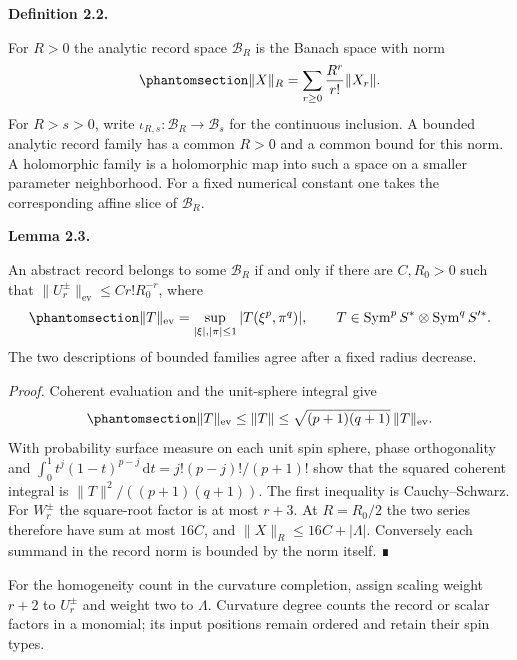 \documentclass[
  english,
  11pt,
  reqno]{amsart}
\makeatletter
\newcommand{\pandocstatementheading}[1]{%
  \par\addpenalty{\@beginparpenalty}%
  \addvspace{.5\baselineskip plus .2\baselineskip minus .2\baselineskip}%
  {\normalfont\bfseries #1\par}%
  \nobreak\@afterindenttrue\@afterheading
}
\makeatother
\begin{document}
\pandocstatementheading{\protect{}\label{def:es-record-scale}Definition 2.2.}

For \(R>0\) the analytic record space \(\mathcal B_R\) is the Banach
space with norm
\begin{equation}\protect\phantomsection\label{eq:es-record-norm}{
 \|X\|_R=\sum_{r\ge0}\frac{R^r}{r!}\|X_r\|.
}\end{equation} For \(R>s>0\), write
\(\iota_{R,s}:\mathcal B_R\to\mathcal B_s\) for the continuous
inclusion. A bounded analytic record family has a common \(R>0\) and a
common bound for this norm. A holomorphic family is a holomorphic map
into such a space on a smaller parameter neighborhood. For a fixed
numerical constant one takes the corresponding affine slice of
\(\mathcal B_R\).

\pandocstatementheading{\protect{}\label{lem:es-record-growth}Lemma 2.3.}

An abstract record belongs to some \(\mathcal B_R\) if and only if there
are \(C,R_0>0\) such that \(\|U_r^\pm\|_{\mathrm{ev}}\le Cr!R_0^{-r}\),
where
\begin{equation}\protect\phantomsection\label{eq:es-evaluation-norm}{
 \|T\|_{\mathrm{ev}}=
 \sup_{|\xi|,|\pi|\le1}|T(\xi^p,\pi^q)|,
 \qquad T\in\operatorname{Sym}^pS^*\otimes\operatorname{Sym}^qS'^* .
}\end{equation} The two descriptions of bounded families agree after a
fixed radius decrease.

\emph{Proof.} Coherent evaluation and the unit-sphere integral give
\begin{equation}\protect\phantomsection\label{eq:es-coherent-norm}{
 \|T\|_{\mathrm{ev}}\le\|T\|
 \le\sqrt{(p+1)(q+1)}\,\|T\|_{\mathrm{ev}}.
}\end{equation} With probability surface measure on each unit spin
sphere, phase orthogonality and
\(\int_0^1t^j(1-t)^{p-j}\,\mathrm dt=j!(p-j)!/(p+1)!\) show that the
squared coherent integral is \(\|T\|^2/((p+1)(q+1))\). The first
inequality is Cauchy--Schwarz. For \(W_r^\pm\) the square-root factor is
at most \(r+3\). At \(R=R_0/2\) the two series therefore have sum at
most \(16C\), and \(\|X\|_R\le16C+|\Lambda|\). Conversely each summand
in the record norm is bounded by the norm itself. ∎

For the homogeneity count in the curvature completion, assign scaling
weight \(r+2\) to \(U_r^\pm\) and weight two to \(\Lambda\). Curvature
degree counts the record or scalar factors in a monomial; its input
positions remain ordered and retain their spin types.
\end{document}

